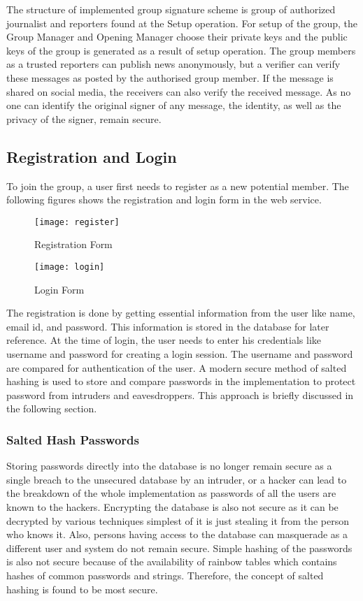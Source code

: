 The structure of implemented group signature scheme is group of authorized journalist and reporters found at the Setup operation. For setup of the group, the Group Manager and Opening Manager choose their private keys and the public keys of the group is generated as a result of setup operation. The group members as a trusted reporters can publish news anonymously, but a verifier can verify these messages as posted by the authorised group member. If the message is shared on social media, the receivers can also verify the received message. As no one can identify the original signer of any message, the identity, as well as the privacy of the signer, remain secure.

\subsection{Registration and Login}
To join the group, a user first needs to register as a new potential member. The following figures shows the registration and login form in the web service.
\begin{figure}[!h]
    \centering
    \texttt{[image: register]}
    \caption{Registration Form}
    \label{fig:Registration Form}
\end{figure}

\begin{figure}[!h]
    \centering
    \texttt{[image: login]}
    \caption{Login Form}
    \label{fig:Login Form}
\end{figure}
The registration is done by getting essential information from the user like name, email id, and password. This information is stored in the database for later reference. At the time of login, the user needs to enter his credentials like username and password for creating a login session. The username and password are compared for authentication of the user. A modern secure method of salted hashing is used to store and compare passwords in the implementation to protect password from intruders and eavesdroppers. This approach is briefly discussed in the following section.

\subsubsection{Salted Hash Passwords}
Storing passwords directly into the database is no longer remain secure as a single breach to the unsecured database by an intruder, or a hacker can lead to the breakdown of the whole implementation as passwords of all the users are known to the hackers. Encrypting the database is also not secure as it can be decrypted by various techniques simplest of it is just stealing it from the person who knows it. Also, persons having access to the database can masquerade as a different user and system do not remain secure. Simple hashing of the passwords is also not secure because of the availability of rainbow tables which contains hashes of common passwords and strings. Therefore, the concept of salted hashing is found to be most secure.

